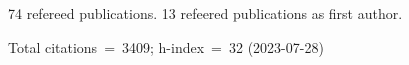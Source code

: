 74 refereed publications. 13 refeered publications as first author.

Total citations~=~3409; h-index~=~32 (2023-07-28)